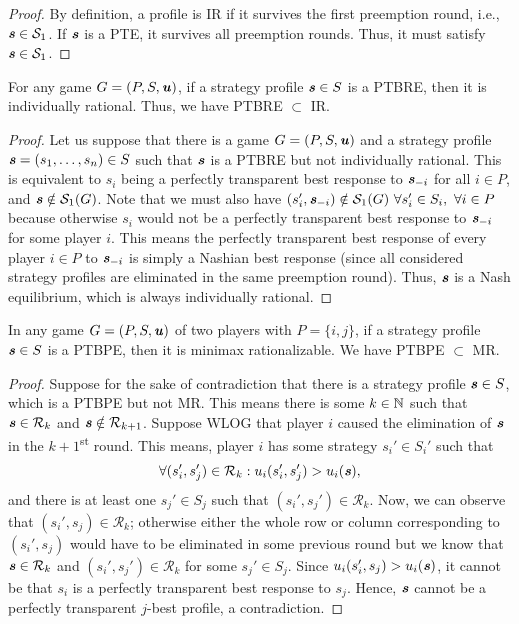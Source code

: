 \begin{proof}
	By definition, a profile is IR if it survives the first preemption round, i.e., $\boldsymbol{\mathit{s}} \in \mathcal{S}_1$.
	If $\boldsymbol{\mathit{s}}$ is a PTE, it survives all preemption rounds.
	Thus, it must satisfy $\boldsymbol{\mathit{s}} \in \mathcal{S}_1$.
\end{proof}

\begin{lemma}
	\label{th:ptbre-subset-ir}
	For any game $G = (P, S, \boldsymbol{\mathit{u}})$, if a strategy profile $\boldsymbol{\mathit{s}} \in S$ is a PTBRE, then it is individually rational.
	Thus, we have PTBRE $\subset$ IR.
\end{lemma}

\begin{proof}
	Let us suppose that there is a game $G = (P, S, \boldsymbol{\mathit{u}})$ and a strategy profile $\boldsymbol{\mathit{s}} = (s_1, \dots, s_n) \in S$ such that $\boldsymbol{\mathit{s}}$ is a PTBRE but not individually rational.
	This is equivalent to $s_i$ being a perfectly transparent best response to $\boldsymbol{\mathit{s}}_{-i}$ for all $i \in P$, and $\boldsymbol{\mathit{s}} \notin \mathcal{S}_1(G)$.
	Note that we must also have $(s_i', \boldsymbol{\mathit{s}}_{-i}) \notin \mathcal{S}_1(G)\ \forall s_i' \in S_i,\ \forall i \in P$ because otherwise $s_i$ would not be a perfectly transparent best response to $\boldsymbol{\mathit{s}}_{-i}$ for some player $i$.
	This means the perfectly transparent best response of every player $i \in P$ to $\boldsymbol{\mathit{s}}_{-i}$ is simply a Nashian best response (since all considered strategy profiles are eliminated in the same preemption round).
	Thus, $\boldsymbol{\mathit{s}}$ is a Nash equilibrium, which is always individually rational.
\end{proof}

\begin{lemma}
	\label{th:ptbpe-subset-mr}
	In any game $G = (P, S, \boldsymbol{\mathit{u}})$ of two players with $P = \{i, j\}$, if a strategy profile $\boldsymbol{\mathit{s}} \in S$ is a PTBPE, then it is minimax rationalizable.
	We have PTBPE $\subset$ MR.
\end{lemma}

\begin{proof}
	Suppose for the sake of contradiction that there is a strategy profile $\boldsymbol{\mathit{s}} \in S$, which is a PTBPE but not MR.
	This means there is some $k \in \mathbb{N}$ such that $\boldsymbol{\mathit{s}} \in \mathcal{R}_k$ and $\boldsymbol{\mathit{s}} \notin \mathcal{R}_{k+1}$.
	Suppose WLOG that player $i$ caused the elimination of $\boldsymbol{\mathit{s}}$ in the $k+1$\textsuperscript{st} round.
	This means, player $i$ has some strategy $s_i' \in S_i'$ such that
	\[
		\forall (s_i', s_j') \in \mathcal{R}_k: u_i(s_i', s_j') > u_i(\boldsymbol{\mathit{s}}),
	\]
	and there is at least one $s_j' \in S_j$ such that $(s_i', s_j') \in \mathcal{R}_k$.
	Now, we can observe that $(s_i', s_j) \in \mathcal{R}_k$; otherwise either the whole row or column corresponding to $(s_i', s_j)$ would have to be eliminated in some previous round but we know that $\boldsymbol{\mathit{s}} \in \mathcal{R}_k$ and $(s_i', s_j') \in \mathcal{R}_k$ for some $s_j' \in S_j$.
	Since $u_i(s_i', s_j) > u_i(\boldsymbol{\mathit{s}})$, it cannot be that $s_i$ is a perfectly transparent best response to $s_j$. Hence, $\boldsymbol{\mathit{s}}$ cannot be a perfectly transparent $j$-best profile, a contradiction.
\end{proof}

